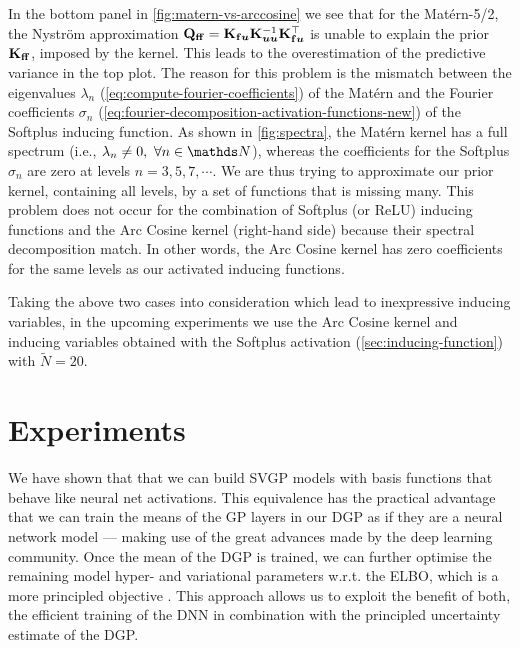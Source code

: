 In the bottom panel in \cref{fig:matern-vs-arccosine} we see that for the Mat\'ern-5/2, the Nystr\"om approximation $\mathbf{{Q}}_{\mathbf{f} \mathbf{f}} = \mathbf{{K}}_{\mathbf{f} \bm{u}} \mathbf{{K}}_{\bm{u} \bm{u}}^{-1} \mathbf{{K}}_{\mathbf{f} \bm{u}}^\top$ is unable to explain the prior $\Kff$, imposed by the kernel. This leads to the overestimation of the predictive variance in the top plot. The reason for this problem is the mismatch between the eigenvalues $\lambda_n$ (\cref{eq:compute-fourier-coefficients}) of the Mat\'ern and the Fourier coefficients $\sigma_n$ (\cref{eq:fourier-decomposition-activation-functions-new}) of the Softplus inducing function. As shown in \cref{fig:spectra}, the Mat\'ern kernel has a full spectrum (i.e., $\lambda_n \neq 0,\ \forall n \in \Naturals$), whereas the coefficients for the Softplus $\sigma_n$ are zero at levels $n=3, 5, 7,\cdots$. We are thus trying to approximate our prior kernel, containing all levels, by a set of functions that is missing many. This problem does not occur for the combination of Softplus (or ReLU) inducing functions and the Arc Cosine kernel (right-hand side) because their spectral decomposition match. In other words, the Arc Cosine kernel has zero coefficients for the same levels as our activated inducing functions. 

Taking the above two cases into consideration which lead to inexpressive inducing variables, in the upcoming experiments we use the Arc Cosine kernel and inducing variables obtained with the Softplus activation (\cref{sec:inducing-function}) with $\tilde{N} = 20$.


\section{Experiments}
\label{section:dnn-for-dgps:experiments}

We have shown that that we can build SVGP models with basis functions that behave like neural net activations. This equivalence has the practical advantage that we can train the means of the GP layers in our DGP as if they are a neural network model --- making use of the great advances made by the deep learning community. Once the mean of the DGP is trained, we can further optimise the remaining model hyper- and variational parameters w.r.t. the ELBO, which is a more principled objective \citep{Fong2019On}. This approach allows us to exploit the benefit of both, the efficient training of the DNN in combination with the principled uncertainty estimate of the DGP. 

